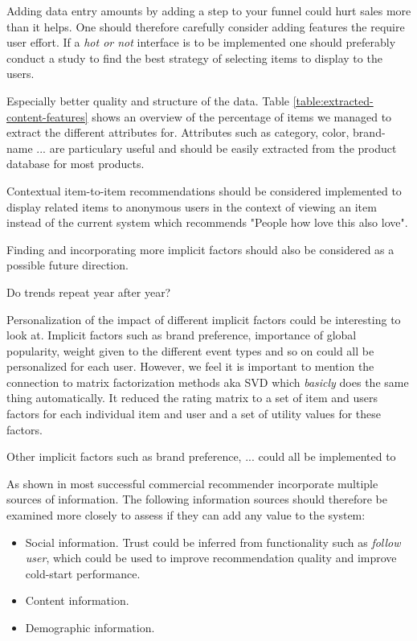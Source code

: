 Adding data entry amounts by adding a step to your funnel could hurt sales more
than it helps. One should therefore carefully consider adding features the
require user effort. If a \emph{hot or not} interface is to be implemented one
should preferably conduct a study to find the best strategy of selecting items
to display to the users.

Especially better quality and structure of the data. Table
\ref{table:extracted-content-features} shows an overview of the percentage of
items we managed to extract the different attributes for. Attributes such as
category, color, brand-name ...  are particulary useful and should be easily
extracted from the product database for most products.


Contextual item-to-item recommendations should be considered implemented to
display related items to anonymous users in the context of viewing an item
instead of the current system which recommends "People how love this also
love".

Finding and incorporating more implicit factors should also be considered as a
possible future direction.

Do trends repeat year after year?

Personalization of the impact of different implicit factors could be
interesting to look at.  Implicit factors such as brand preference, importance
of global popularity, weight given to the different event types and so on could
all be personalized for each user.  However, we feel it is important to mention
the connection to matrix factorization methods aka SVD which \emph{basicly}
does the same thing automatically. It reduced the rating matrix to a set of
item and users factors for each individual item and user and a set of utility
values for these factors.


Other implicit factors such as brand preference, ... could all be implemented
to

As shown in \cite{FranceTelecom} most successful commercial recommender
incorporate multiple sources of information. The following information sources
should therefore be examined more closely to assess if they can add any value
to the system:

\begin{itemize}
\item Social information. Trust could be inferred from functionality such as
\emph{follow user}, which could be used to improve recommendation quality and
improve cold-start performance.
\item Content information.
\item Demographic information.
\end{itemize}

